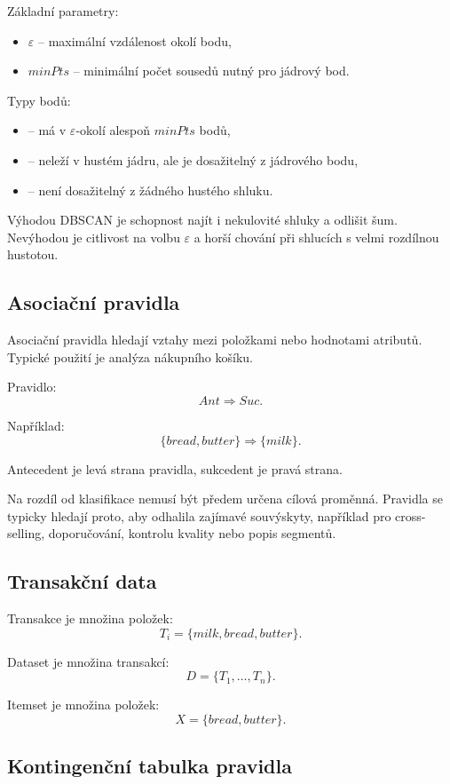 Základní parametry:
\begin{itemize}
    \item $\varepsilon$ -- maximální vzdálenost okolí bodu,
    \item $minPts$ -- minimální počet sousedů nutný pro jádrový bod.
\end{itemize}

Typy bodů:
\begin{itemize}
    \item {} -- má v $\varepsilon$-okolí alespoň $minPts$ bodů,
    \item {} -- neleží v hustém jádru, ale je dosažitelný z jádrového bodu,
    \item {} -- není dosažitelný z žádného hustého shluku.
\end{itemize}

Výhodou DBSCAN je schopnost najít i nekulovité shluky a odlišit šum. Nevýhodou je citlivost na volbu
$\varepsilon$ a horší chování při shlucích s velmi rozdílnou hustotou.

\subsection{Asociační pravidla}

Asociační pravidla hledají vztahy mezi položkami nebo hodnotami atributů. Typické použití je analýza
nákupního košíku.

Pravidlo:
\[
Ant \Rightarrow Suc.
\]

Například:
\[
\{bread,butter\}\Rightarrow\{milk\}.
\]

Antecedent je levá strana pravidla, sukcedent je pravá strana.

Na rozdíl od klasifikace nemusí být předem určena cílová proměnná. Pravidla se typicky hledají proto, aby
odhalila zajímavé souvýskyty, například pro cross-selling, doporučování, kontrolu kvality nebo popis segmentů.

\subsection{Transakční data}

Transakce je množina položek:
\[
T_i=\{milk,bread,butter\}.
\]

Dataset je množina transakcí:
\[
D=\{T_1,\ldots,T_n\}.
\]

Itemset je množina položek:
\[
X=\{bread,butter\}.
\]

\subsection{Kontingenční tabulka pravidla}

